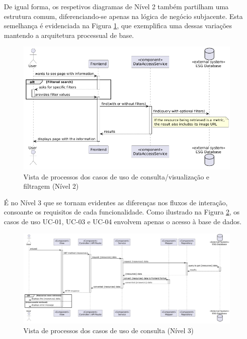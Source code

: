 De igual forma, os respetivos diagramas de Nível 2 também partilham uma estrutura comum, diferenciando-se apenas na lógica de negócio subjacente. Esta semelhança é evidenciada na Figura \ref{fig:UC12345-lvl2}, que exemplifica uma dessas variações mantendo a arquitetura processual de base.

\begin{figure}[H]
\centering
\includegraphics[width=5in]{frontmatter/assets/diagrams/Process Views/UC12345-lvl2.png}
\caption{Vista de processos dos casos de uso de consulta/visualização e filtragem (Nível 2)}
\label{fig:UC12345-lvl2}
\end{figure}

É no Nível 3 que se tornam evidentes as diferenças nos fluxos de interação, consoante os requisitos de cada funcionalidade. Como ilustrado na Figura \ref{fig:UC134-lvl3}, os casos de uso UC-01, UC-03 e UC-04 envolvem apenas o acesso à base de dados.

\begin{figure}[H]
\centering
\includegraphics[width=\linewidth]{frontmatter/assets/diagrams/Process Views/LVL3/uc134-lvl3.png}
\caption{Vista de processos dos casos de uso de consulta (Nível 3)}
\label{fig:UC134-lvl3}
\end{figure}

